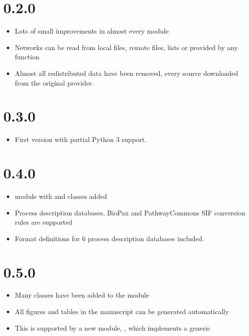 \documentclass[letterpaper,10pt,english]{sphinxmanual}
\begin{document}
\section{0.2.0}
\label{\detokenize{changelog:id2}}\begin{itemize}
\item {} 
Lots of small improvements in almost every module

\item {} 
Networks can be read from local files, remote files, lists or provided by
any function

\item {} 
Almost all redistributed data have been removed, every source downloaded
from the original provider.

\end{itemize}


\section{0.3.0}
\label{\detokenize{changelog:id3}}\begin{itemize}
\item {} 
First version with partial Python 3 support.

\end{itemize}


\section{0.4.0}
\label{\detokenize{changelog:id4}}\begin{itemize}
\item {} 
 module with  and  classes added

\item {} 
Process description databases, BioPax and PathwayCommons SIF conversion
rules are supported

\item {} 
Format definitions for 6 process description databases included.

\end{itemize}


\section{0.5.0}
\label{\detokenize{changelog:id5}}\begin{itemize}
\item {} 
Many classes have been added to the  module

\item {} 
All figures and tables in the manuscript can be generated automatically

\item {} 
This is supported by a new module, , which implements a generic

\end{itemize}
\end{document}
